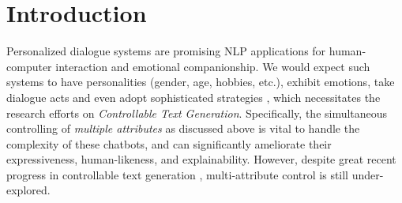 \section{Introduction}
\label{sec:intro}
Personalized dialogue systems are promising NLP applications for human-computer interaction and emotional companionship. We would expect such systems to have personalities (gender, age, hobbies, etc.), exhibit emotions, take dialogue acts and even adopt sophisticated strategies \citep{liu2021towards}, which necessitates the research efforts on \textit{Controllable Text Generation}. Specifically, the simultaneous controlling of \textit{multiple attributes} as discussed above is vital to handle the complexity of these chatbots, and can significantly ameliorate their expressiveness, human-likeness, and explainability. However, despite great recent progress in controllable text generation \citep{dathathri2019plug,keskar2019ctrl,krause2021gedi}, multi-attribute control is still under-explored. 


